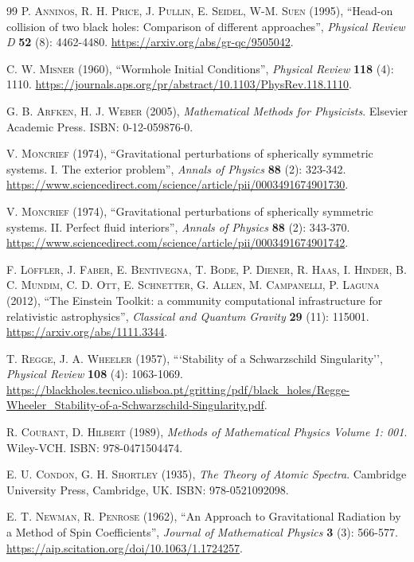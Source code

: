 \documentclass{article}
\begin{document}
\begin{thebibliography}{99}
\textsc{P. Anninos, R. H. Price, J. Pullin, E. Seidel, W-M. Suen} (1995), ``Head-on collision of two black holes: Comparison of different approaches'', \textit{Physical Review D} \textbf{52} (8): 4462-4480. \url{https://arxiv.org/abs/gr-qc/9505042}.

\textsc{C. W. Misner} (1960), ``Wormhole Initial Conditions'', \textit{Physical Review} \textbf{118} (4): 1110. \url{https://journals.aps.org/pr/abstract/10.1103/PhysRev.118.1110}.

\textsc{G. B. Arfken, H. J. Weber} (2005), \textit{Mathematical Methods for Physicists}. Elsevier Academic Press. ISBN: 0-12-059876-0.

\textsc{V. Moncrief} (1974), ``Gravitational perturbations of spherically symmetric systems. I. The exterior problem'', \textit{Annals of Physics} \textbf{88} (2): 323-342. \url{https://www.sciencedirect.com/science/article/pii/0003491674901730}.

\textsc{V. Moncrief} (1974), ``Gravitational perturbations of spherically symmetric systems. II. Perfect fluid interiors'', \textit{Annals of Physics} \textbf{88} (2): 343-370. \url{https://www.sciencedirect.com/science/article/pii/0003491674901742}.

\textsc{F. L\"offler, J. Faber, E. Bentivegna, T. Bode, P. Diener, R. Haas, I. Hinder, B. C. Mundim, C. D. Ott, E. Schnetter, G. Allen, M. Campanelli, P. Laguna} (2012), ``The Einstein Toolkit: a community computational infrastructure for relativistic astrophysics'', \textit{Classical and Quantum Gravity} \textbf{29} (11): 115001. \url{https://arxiv.org/abs/1111.3344}.

\textsc{T. Regge, J. A. Wheeler} (1957), ```Stability of a Schwarzschild Singularity'', \textit{Physical Review} \textbf{108} (4): 1063-1069. \url{https://blackholes.tecnico.ulisboa.pt/gritting/pdf/black_holes/Regge-Wheeler_Stability-of-a-Schwarzschild-Singularity.pdf}.

\textsc{R. Courant, D. Hilbert} (1989), \textit{Methods of Mathematical Physics Volume 1: 001}. Wiley-VCH. ISBN: 978-0471504474.

\textsc{E. U. Condon, G. H. Shortley} (1935), \textit{The Theory of Atomic Spectra}. Cambridge University Press, Cambridge, UK. ISBN: 978-0521092098.

\textsc{E. T. Newman, R. Penrose} (1962), ``An Approach to Gravitational Radiation by a Method of Spin Coefficients'', \textit{Journal of Mathematical Physics} \textbf{3} (3): 566-577. \url{https://aip.scitation.org/doi/10.1063/1.1724257}.


\end{thebibliography}
\end{document}
